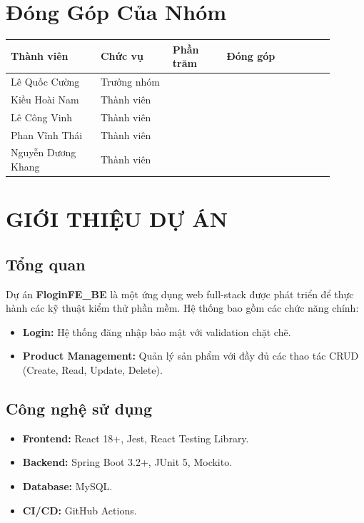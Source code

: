 \documentclass[a4paper,12pt]{article}
\begin{document}
\section*{Đóng Góp Của Nhóm}

\begin{longtable}{|p{0.25\linewidth}|p{0.2\linewidth}|p{0.15\linewidth}|p{0.3\linewidth}|}
\hline
\textbf{Thành viên} & \textbf{Chức vụ} & \textbf{Phần trăm} & \textbf{Đóng góp} \\
\hline
\endhead
Lê Quốc Cường & Trưởng nhóm & & \\ \hline
Kiều Hoài Nam & Thành viên & & \\ \hline
Lê Công Vinh & Thành viên & & \\ \hline
Phan Vĩnh Thái & Thành viên & & \\ \hline
Nguyễn Dương Khang & Thành viên & & \\ \hline
\end{longtable}

\section{GIỚI THIỆU DỰ ÁN}

\subsection{Tổng quan}
Dự án \textbf{FloginFE\_BE} là một ứng dụng web full-stack được phát triển để thực hành các kỹ thuật kiểm thử phần mềm. Hệ thống bao gồm các chức năng chính:
\begin{itemize}
    \item \textbf{Login:} Hệ thống đăng nhập bảo mật với validation chặt chẽ.
    \item \textbf{Product Management:} Quản lý sản phẩm với đầy đủ các thao tác CRUD (Create, Read, Update, Delete).
\end{itemize}

\subsection{Công nghệ sử dụng}
\begin{itemize}
    \item \textbf{Frontend:} React 18+, Jest, React Testing Library.
    \item \textbf{Backend:} Spring Boot 3.2+, JUnit 5, Mockito.
    \item \textbf{Database:} MySQL.
    \item \textbf{CI/CD:} GitHub Actions.
\end{itemize}
\end{document}
